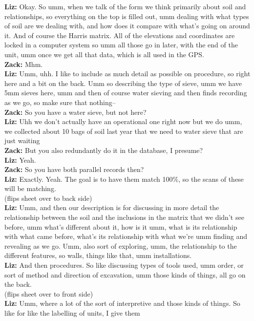 \documentclass[
]{article}
\begin{document}
\textbf{Liz:} Okay. So umm, when we talk of the form we think primarily
about soil and relationships, so everything on the top is filled out,
umm dealing with what types of soil are we dealing with, and how does it
compare with what's going on around it. And of course the Harris matrix.
All of the elevations and coordinates are locked in a computer system so
umm all those go in later, with the end of the unit, umm once we get all
that data, which is all used in the GPS.\\
\textbf{Zack:} Mhm.\\
\textbf{Liz:} Umm, uhh. I like to include as much detail as possible on
procedure, so right here and a bit on the back. Umm so describing the
type of sieve, umm we have 5mm sieves here, umm and then of course water
sieving and then finds recording as we go, so make sure that nothing--\\
\textbf{Zack:} So you have a water sieve, but not here?\\
\textbf{Liz:} Uhh we don't actually have an operational one right now
but we do umm, we collected about 10 bags of soil last year that we need
to water sieve that are just waiting\\
\textbf{Zack:} But you also redundantly do it in the database, I
presume?\\
\textbf{Liz:} Yeah.\\
\textbf{Zack:} So you have both parallel records then?\\
\textbf{Liz:} Exactly. Yeah. The goal is to have them match 100\%, so
the scans of these will be matching.\\
(flips sheet over to back side)\\
\textbf{Liz:} Umm, and then our description is for discussing in more
detail the relationship between the soil and the inclusions in the
matrix that we didn't see before, umm what's different about it, how is
it umm, what is its relationship with what came before, what's its
relationship with what we're umm finding and revealing as we go. Umm,
also sort of exploring, umm, the relationship to the different features,
so walls, things like that, umm installations.\\
\textbf{Liz:} And then procedures. So like discussing types of tools
used, umm order, or sort of method and direction of excavation, umm
those kinds of things, all go on the back.\\
(flips sheet over to front side)\\
\textbf{Liz:} Umm, where a lot of the sort of interpretive and those
kinds of things. So like for like the labelling of units, I give them
\end{document}
